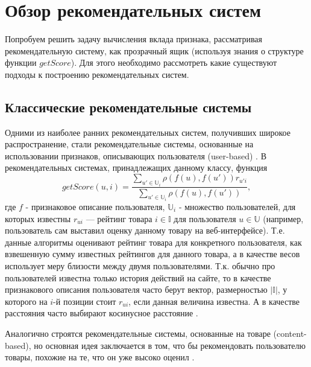 \documentclass[12pt,a4paper]{report}
\begin{document}
\section{Обзор рекомендательных систем}
Попробуем решить задачу вычисления вклада признака, рассматривая рекомендательную систему, как прозрачный ящик (используя знания о структуре функции $getScore$). Для этого необходимо рассмотреть какие существуют подходы к построению рекомендательных систем.

\subsection{Классические рекомендательные системы}
Одними из наиболее ранних рекомендательных систем, получивших широкое распространение, стали рекомендательные системы,
 основанные на использовании признаков, описывающих пользователя (user-based) \cite{Ubrs}. В рекомендательных системах, принадлежащих данному классу, функция
\begin{equation*}
getScore(u, i) = \frac{\sum_{u' \in \mathbb{U}_i} \rho(f(u), f(u')) r_{u'i}}{\sum_{u' \in \mathbb{U}_i} \rho(f(u), f(u')) },
\end{equation*}
где $f$ - признаковое описание пользователя, $\mathbb{U}_i$ -  множество пользователей, для которых известны $r_{ui}$ --- рейтинг товара $i \in \mathbb{I} $ для пользователя $u \in \mathbb{U}$ (например, пользователь сам выставил оценку данному товару на веб-интерфейсе). Т.е. данные алгоритмы оценивают рейтинг товара для конкретного пользователя, как взвешенную сумму известных рейтингов для данного товара, а в качестве весов использует меру близости между двумя пользователями. Т.к. обычно про пользователей известна только история действий на сайте, то в качестве признакового описания пользователя часто берут вектор, размерностью $|\mathbb{I}|$, у которого на $i$-й позиции стоит $r_{ui}$, если данная величина известна. А в качестве расстояния часто выбирают косинусное расстояние \cite{Cos}.

Аналогично строятся рекомендательные системы, основанные на товаре (content-based), но основная идея заключается в том, что бы рекомендовать пользователю товары, похожие на те, что он уже высоко оценил \cite{Cbrs}.
\end{document}
